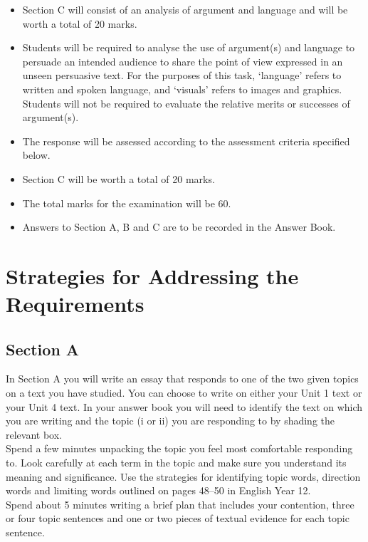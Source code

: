 \documentclass[a4paper]{article}
\begin{document}
\begin{itemize}
\item Section C will consist of an analysis of argument and language and will be worth a total of 20 marks. 
\item Students will be required to analyse the use of argument(s) and language to persuade an intended audience to share the point of view expressed in an unseen persuasive text. For the purposes of this task, ‘language’ refers to written and spoken language, and ‘visuals’ refers to images and graphics. Students will not be required to evaluate the relative merits or successes of argument(s).
\item The response will be assessed according to the assessment criteria specified below.
\item Section C will be worth a total of 20 marks.
\item The total marks for the examination will be 60.
\item Answers to Section A, B and C are to be recorded in the Answer Book.

\end{itemize}

\section{Strategies for Addressing the Requirements}
\subsection{Section A}
In Section A you will write an essay that responds to one of the two given topics on a text you have studied. You can choose to write on either your Unit 1 text or your Unit 4 text. In your answer book you will need to identify the text on which you are writing and the topic (i or ii) you are responding to by shading the relevant box.\\

Spend a few minutes unpacking the topic you feel most comfortable responding to. Look carefully at each term in the topic and make sure you understand its meaning and significance. Use the strategies for identifying topic words, direction words and limiting words outlined on pages 48–50 in English Year 12.\\

Spend about 5 minutes writing a brief plan that includes your contention, three or four topic sentences and one or two pieces of textual evidence for each topic sentence.\\
\end{document}
